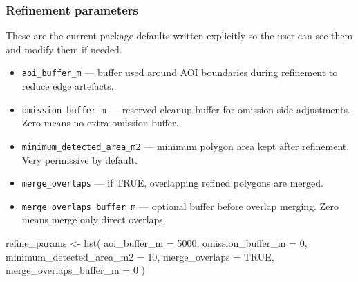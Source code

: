 \documentclass[
  british,
  a4paper,
]{scrbook}
\newenvironment{Shaded}{\begin{snugshade}}{\end{snugshade}}
\newcommand{\AttributeTok}[1]{\textcolor[rgb]{0.40,0.45,0.13}{#1}}
\newcommand{\ConstantTok}[1]{\textcolor[rgb]{0.56,0.35,0.01}{#1}}
\newcommand{\ControlFlowTok}[1]{\textcolor[rgb]{0.00,0.23,0.31}{\textbf{#1}}}
\newcommand{\DecValTok}[1]{\textcolor[rgb]{0.68,0.00,0.00}{#1}}
\newcommand{\FunctionTok}[1]{\textcolor[rgb]{0.28,0.35,0.67}{#1}}
\newcommand{\NormalTok}[1]{\textcolor[rgb]{0.00,0.23,0.31}{#1}}
\newcommand{\OtherTok}[1]{\textcolor[rgb]{0.00,0.23,0.31}{#1}}
\newcommand{\SpecialCharTok}[1]{\textcolor[rgb]{0.37,0.37,0.37}{#1}}
\newcommand{\StringTok}[1]{\textcolor[rgb]{0.13,0.47,0.30}{#1}}
\providecommand{\tightlist}{%
  \setlength{\itemsep}{0pt}\setlength{\parskip}{0pt}}
\begin{document}
\begin{Shaded}
\end{Shaded}

\subsubsection{Refinement parameters}\label{refinement-parameters}

These are the current package defaults written explicitly so the user
can see them and modify them if needed.

\begin{itemize}
\tightlist
\item
  \texttt{aoi\_buffer\_m} --- buffer used around AOI boundaries during
  refinement to reduce edge artefacts.
\item
  \texttt{omission\_buffer\_m} --- reserved cleanup buffer for
  omission-side adjustments. Zero means no extra omission buffer.
\item
  \texttt{minimum\_detected\_area\_m2} --- minimum polygon area kept
  after refinement. Very permissive by default.
\item
  \texttt{merge\_overlaps} --- if TRUE, overlapping refined polygons are
  merged.
\item
  \texttt{merge\_overlaps\_buffer\_m} --- optional buffer before overlap
  merging. Zero means merge only direct overlaps.
\end{itemize}

\begin{Shaded}
\begin{Highlighting}[]
\NormalTok{refine\_params }\OtherTok{\textless{}{-}} \FunctionTok{list}\NormalTok{(}
  \AttributeTok{aoi\_buffer\_m =} \DecValTok{5000}\NormalTok{,}
  \AttributeTok{omission\_buffer\_m =} \DecValTok{0}\NormalTok{,}
  \AttributeTok{minimum\_detected\_area\_m2 =} \DecValTok{10}\NormalTok{,}
  \AttributeTok{merge\_overlaps =} \ConstantTok{TRUE}\NormalTok{,}
  \AttributeTok{merge\_overlaps\_buffer\_m =} \DecValTok{0}
\NormalTok{)}
\end{Highlighting}
\end{Shaded}
\end{document}
